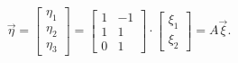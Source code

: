 \begin{enumerate}[label=\alph*)]
  \begin{equation*}
    \vec{ \eta } =
    \begin{bmatrix}
      \eta_1 \\
      \eta_2 \\
      \eta_3
    \end{bmatrix} =
    \begin{bmatrix}
      1 & -1 \\
      1 & 1 \\
      0 & 1
    \end{bmatrix} \cdot
    \begin{bmatrix}
      \xi_1 \\
      \xi_2
    \end{bmatrix} =
    A \vec{ \xi }.
  \end{equation*}


\end{enumerate}
